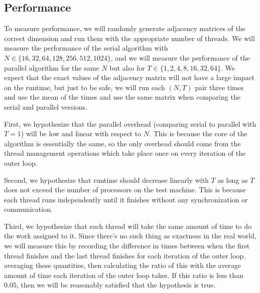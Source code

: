 \documentclass{article}
\begin{document}
\subsection*{Performance}
To measure performance, we will randomly generate adjacency matrices of the correct dimension and run them with the appropriate number of threads. We will measure the performance of the serial algorithm with $N\in\{16,32,64,128,256,512,1024\}$, and we will measure the performance of the parallel algorithm for the same $N$ but also for $T\in\{1,2,4,8,16,32,64\}$. We expect that the exact values of the adjacency matrix will not have a large impact on the runtime, but just to be safe, we will run each $(N,T)$ pair three times and use the mean of the times and use the same matrix when comparing the serial and parallel versions.

First, we hypothesize that the parallel overhead (comparing serial to parallel with $T=1$) will be low and linear with respect to $N$. This is because the core of the algorithm is essentially the same, so the only overhead should come from the thread management operations which take place once on every iteration of the outer loop.

Second, we hypothesize that runtime should decrease linearly with $T$ as long as $T$ does not exceed the number of processors on the test machine. This is because each thread runs independently until it finishes without any synchronization or communication.

Third, we hypothesize that each thread will take the same amount of time to do the work assigned to it. Since there's no such thing as exactness in the real world, we will measure this by recording the difference in times between when the first thread finishes and the last thread finishes for each iteration of the outer loop, averaging these quantities, then calculating the ratio of this with the average amount of time each iteration of the outer loop takes. If this ratio is less than $0.05$, then we will be reasonably satisfied that the hypothesis is true.
\end{document}
